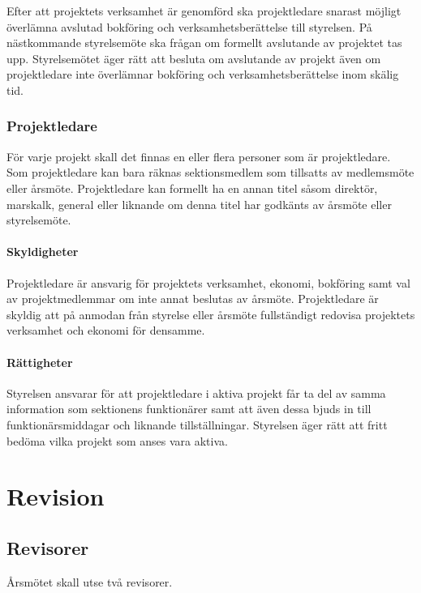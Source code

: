 \documentclass{../resources/dgovdoc}
\begin{document}
Efter att projektets verksamhet är genomförd ska projektledare snarast möjligt
överlämna avslutad bokföring och verksamhetsberättelse till styrelsen.
På nästkommande styrelsemöte ska frågan om formellt avslutande av projektet tas upp.
Styrelsemötet äger rätt att besluta om avslutande av projekt även om projektledare inte
överlämnar bokföring och verksamhetsberättelse inom skälig tid.

\subsubsection{Projektledare}

För varje projekt skall det finnas en eller flera personer som är
projektledare. Som projektledare kan bara räknas sektionsmedlem som tillsatts
av medlemsmöte eller årsmöte. Projektledare kan formellt ha en annan titel såsom direktör, marskalk,
general eller liknande om denna titel har godkänts av årsmöte eller styrelsemöte.

\paragraph{Skyldigheter}

Projektledare är ansvarig för projektets verksamhet, ekonomi, bokföring samt
val av projektmedlemmar om inte annat beslutas av årsmöte. Projektledare är
skyldig att på anmodan från styrelse eller årsmöte fullständigt redovisa
projektets verksamhet och ekonomi för densamme.

\paragraph{Rättigheter}

Styrelsen ansvarar för att projektledare i aktiva projekt får ta del av
samma information som sektionens funktionärer samt att även dessa bjuds
in till funktionärsmiddagar och liknande tillställningar. Styrelsen äger
rätt att fritt bedöma vilka projekt som anses vara aktiva.

\section{Revision}

\subsection{Revisorer}
\label{sec:revisorer}

Årsmötet skall utse två revisorer.
\end{document}
